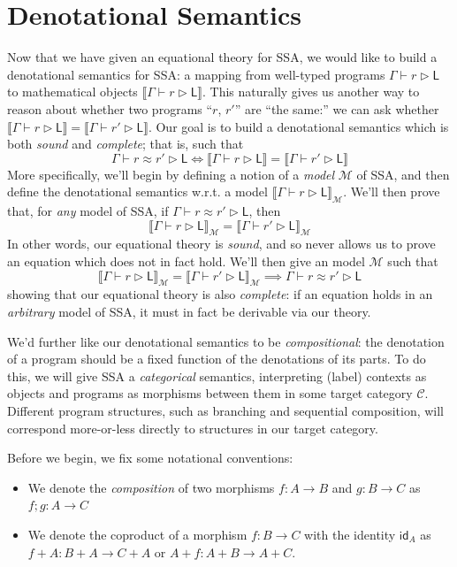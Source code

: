 \documentclass[acmsmall,screen,review]{acmart}
\newcommand{\mc}[1]{\ensuremath{\mathcal{#1}}}
\newcommand{\ms}[1]{\ensuremath{\mathsf{#1}}}
\newcommand{\haslb}[3]{#1 \vdash #2 \rhd #3}
\newcommand{\teqv}{\approx}
\newcommand{\lbeq}[4]{#1 \vdash #2 \teqv #3 \rhd {#4}}
\newcommand{\dnt}[1]{\llbracket{#1}\rrbracket}
\begin{document}
\section{Denotational Semantics}

\label{sec:densem}

Now that we have given an equational theory for SSA, we would like to build a denotational semantics
for SSA: a mapping from well-typed programs $\haslb{\Gamma}{r}{\ms{L}}$ to mathematical objects
$\dnt{\haslb{\Gamma}{r}{\ms{L}}}$. This naturally gives us another way to reason about whether two
programs ``$r$, $r'$'' are ``the same:'' we can ask whether
$
\dnt{\haslb{\Gamma}{r}{\ms{L}}} = \dnt{\haslb{\Gamma}{r'}{\ms{L}}}
$.
Our goal is to build a denotational semantics which is both \emph{sound} and \emph{complete}; that
is, such that
$$
\lbeq{\Gamma}{r}{r'}{\ms{L}} \iff
\dnt{\haslb{\Gamma}{r}{\ms{L}}} = \dnt{\haslb{\Gamma}{r'}{\ms{L}}}
$$
More specifically, we'll begin by defining a notion of a \emph{model} $\mc{M}$ of SSA, and then
define the denotational semantics w.r.t. a model $\dnt{\haslb{\Gamma}{r}{\ms{L}}}_{\mc{M}}$. We'll
then prove that, for \emph{any} model of SSA, if $\lbeq{\Gamma}{r}{r'}{\ms{L}}$, then
$$
\dnt{\haslb{\Gamma}{r}{\ms{L}}}_{\mc{M}} = \dnt{\haslb{\Gamma}{r'}{\ms{L}}}_{\mc{M}}
$$
In other words, our equational theory is \emph{sound}, and so never allows us to prove an equation
which does not in fact hold. We'll then give an model $\mc{M}$ such that
$$
\dnt{\haslb{\Gamma}{r}{\ms{L}}}_{\mc{M}} = \dnt{\haslb{\Gamma}{r'}{\ms{L}}}_{\mc{M}} \implies
\lbeq{\Gamma}{r}{r'}{\ms{L}}
$$
showing that our equational theory is also \emph{complete}: if an equation holds in an
\emph{arbitrary} model of SSA, it must in fact be derivable via our theory.

We'd further like our denotational semantics to be \emph{compositional}: the denotation of a program
should be a fixed function of the denotations of its parts. To do this, we will give SSA a
\emph{categorical} semantics, interpreting (label) contexts as objects and programs as morphisms
between them in some target category $\mc{C}$. Different program structures, such as branching and
sequential composition, will correspond more-or-less directly to structures in our target category.

Before we begin, we fix some notational conventions:
\begin{itemize}
  \item We denote the \emph{composition} of two morphisms $f : A \to B$ and $g : B \to C$ as $f ; g
  : A \to C$
  \item We denote the coproduct of a morphism $f: B \to C$ with the identity $\ms{id}_A$ as $f + A:
  B + A \to C + A$ or $A + f: A + B \to A + C$.
\end{itemize}
\end{document}
